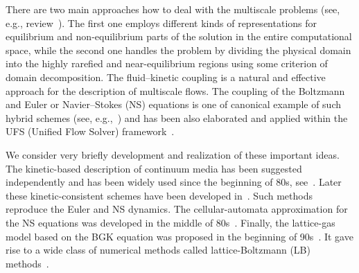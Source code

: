 \documentclass[]{elsarticle} %
\begin{document}
There are two main approaches how to deal with the multiscale problems (see, e.g., review~\cite{Dimarco2014}).
The first one employs different kinds of representations for equilibrium and non-equilibrium parts of the solution
in the entire computational space, while the second one handles the problem by dividing the physical domain
into the highly rarefied and near-equilibrium regions using some criterion of domain decomposition.
The fluid--kinetic coupling is a natural and effective approach for the description of multiscale flows.
The coupling of the Boltzmann and Euler or Navier--Stokes (NS) equations
is one of canonical example of such hybrid schemes (see, e.g.,~\cite{Bourgat1996, Tallec1997})
and has been also elaborated and applied within the UFS (Unified Flow Solver) framework~\cite{Kolobov2007}.

We consider very briefly development and realization of these important ideas.
The kinetic-based description of continuum media has been suggested independently and has been widely used since the beginning of 80s,
see~\cite{Potkin1975, Pullin1980, Reitz1981, Aristov1983}. Later these kinetic-consistent schemes have been developed
in~\cite{Elizarova1985, Deshpande1986, Prendergast1993, Chou1997, Ohwada2004Xu, Ohwada2004Kobayashi, Ohwada2006}.
Such methods reproduce the Euler and NS dynamics.
The cellular-automata approximation for the NS equations was developed in the middle of 80s~\cite{Frisch1986}.
Finally, the lattice-gas model based on the BGK equation was proposed in the beginning of 90s~\cite{Qian1992}.
It gave rise to a wide class of numerical methods called lattice-Boltzmann (LB) methods~\cite{Succi2001}.
\end{document}
